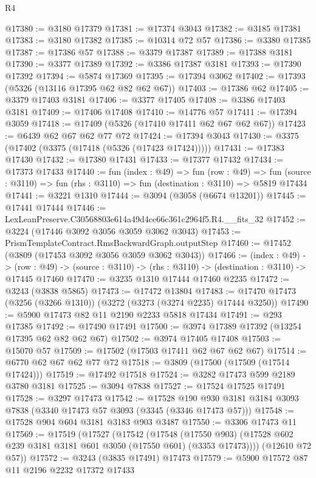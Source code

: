 \begin{lexlean}{R4}
\begin{coremodule}
@17380 := @3180 @17379
@17381 := @17374 @3043
@17382 := @3185 @17381
@17383 := @3180 @17382
@17385 := @10314 @72 @57
@17386 := @3380 @17385
@17387 := @17386 @57
@17388 := @3379 @17387
@17389 := @17388 @3181
@17390 := @3377 @17389
@17392 := @3386 @17387 @3181
@17393 := @17390 @17392
@17394 := @5874 @17369
@17395 := @17394 @3062
@17402 := @17393 (@5326 (@13116 @17395 @62 @82 @62 @67))
@17403 := @17386 @62
@17405 := @3379 @17403 @3181
@17406 := @3377 @17405
@17408 := @3386 @17403 @3181
@17409 := @17406 @17408
@17410 := @14776 @57
@17411 := @17394 @3059
@17418 := @17409 (@5326 (@17410 @17411 @62 @67 @62 @67))
@17423 := @6439 @62 @67 @62 @77 @72
@17424 := @17394 @3043
@17430 := @3375 (@17402 (@3375 (@17418 (@5326 (@17423 @17424)))))
@17431 := @17383 @17430
@17432 := @17380 @17431
@17433 := @17377 @17432
@17434 := @17373 @17433
@17440 := fun (index : @49) =>
  fun (row : @49) =>
  fun (source : @3110) => fun (rhs : @3110) => fun (destination : @3110) => @5819 @17434
@17441 := @3221 @1310
@17444 := @3094 (@3058 (@6674 @13201))
@17445 := @17441 @17444
@17446 := LexLeanPreserve.C30568803e614a49d4ce66c361c2964f5.R4.__fits_32
@17452 := @3224 (@17446 @3092 @3056 @3059 @3062 @3043)
@17453 := PrismTemplateContract.RmsBackwardGraph.outputStep
@17460 := @17452 (@3809 (@17453 @3092 @3056 @3059 @3062 @3043))
@17466 := (index : @49) ->
  (row : @49) -> (source : @3110) -> (rhs : @3110) -> (destination : @3110) -> @17445 @17460
@17470 := @3235 @1310 @17444 @17460 @2235
@17472 := @3243 (@3838 @5865)
@17473 := @17472 @13804
@17483 := @17470 @17473 (@3256 (@3266 @1310)) (@3272 (@3273 (@3274 @2235) @17444 @3250))
@17490 := @5900 @17473 @82 @11 @2190 @2233 @5818 @17434
@17491 := @293 @17385
@17492 := @17490 @17491
@17500 := @3974 @17389 @17392 (@13254 @17395 @62 @82 @62 @67)
@17502 := @3974 @17405 @17408
@17503 := @15070 @57
@17509 := @17502 (@17503 @17411 @62 @67 @62 @67)
@17514 := @6770 @62 @67 @62 @77 @72
@17518 := @3809 (@17500 (@17509 (@17514 @17424)))
@17519 := @17492 @17518
@17524 := @3282 @17473 @599 @2189 @3780 @3181
@17525 := @3094 @7838
@17527 := @17524 @17525 @17491
@17528 := @3297 @17473
@17542 := @17528
    @190
    @930
    @3181
    @3184
    @3093
    @7838
    (@3340 @17473 @57 @3093 (@3345 (@3346 @17473 @57)))
@17548 := @17528 @904 @604 @3181 @3183 @903 @3487
@17550 := @3306 @17473 @11
@17569 := @17519
    (@17527
      (@17542
        (@17548
          (@17550 @903)
          (@17528 @602 @239 @3181 @3181 @601 @3050 (@17550 @601) (@3353 @17473))))
      (@12610 @72 @57))
@17572 := @3243 (@3835 @17491) @17473
@17579 := @5900 @17572 @87 @11 @2196 @2232 @17372 @17433

\end{coremodule}
\end{lexlean}
